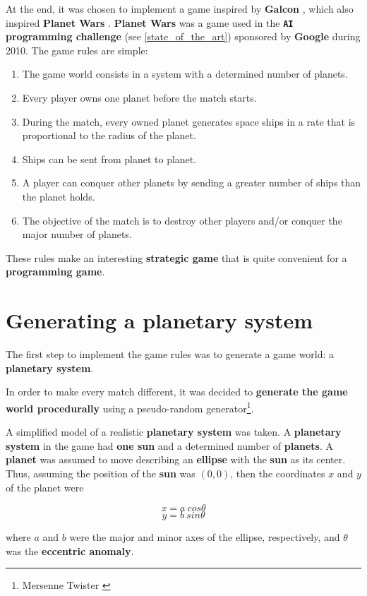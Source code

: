 \documentclass[a4paper,11pt,titlepage,abstract,numbers=noenddot,automark,mnsy,intlimits,rgb,dvipsnames]{report}
\begin{document}
At the end, it was chosen to implement a game inspired by \textbf{Galcon} \cite{galcon}, which also inspired
\textbf{Planet Wars} \cite{planet_wars}. \textbf{Planet Wars} was a game used in the \textbf{\texttt{AI} programming challenge}
(see \autoref{state_of_the_art}) sponsored by \textbf{Google} during 2010. The game rules are simple:
\begin{enumerate}
\item
The game world consists in a system with a determined number of planets.
\item
Every player owns one planet before the match starts.
\item
During the match, every owned planet generates space ships in a rate that is proportional to the radius of the planet.
\item
Ships can be sent from planet to planet.
\item
A player can conquer other planets by sending a greater number of ships than the planet holds.
\item
The objective of the match is to destroy other players and/or conquer the major number of planets.
\end{enumerate}
These rules make an interesting \textbf{strategic game} that is quite convenient for a \textbf{programming game}.
\section{Generating a planetary system}
The first step to implement the game rules was to generate a game world: a \textbf{planetary system}.

In order to make every match different, it was decided to \textbf{generate the game world procedurally} using a pseudo-random
generator\footnote{Mersenne Twister \cite{mersenne_twister}}.

A simplified model of a realistic \textbf{planetary system} was taken. A \textbf{planetary system} in the game had \textbf{one sun} and a
determined number of \textbf{planets}. A \textbf{planet} was assumed to move describing an \textbf{ellipse} with the \textbf{sun} as its center.
Thus, assuming the position of the \textbf{sun} was $(0, 0)$, then the coordinates $x$ and $y$ of the planet were

$$x = a \: cos \theta$$
$$y = b \: sin \theta$$

where $a$ and $b$ were the major and minor axes of the ellipse, respectively, and $\theta$ was the \textbf{eccentric anomaly}.
\end{document}
